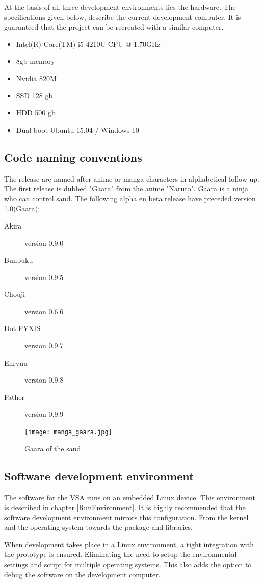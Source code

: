 \documentclass[11pt,fleqn,,a4paper,twoside,openright]{book}
\begin{document}
At the basis of all three development environments lies the hardware. The specifications given below, describe the current development computer. It is guaranteed that the project can be recreated with a similar computer. 
\begin{itemize}
	\item Intel(R) Core(TM) i5-4210U CPU @ 1.70GHz
	\item 8gb memory
	\item Nvidia 820M
	\item SSD 128 gb
	\item HDD 500 gb
	\item Dual boot Ubuntu 15.04 / Windows 10	
\end{itemize}

\subsection{Code naming conventions}
The release are named after anime or manga characters in alphabetical follow up. The first release is dubbed "Gaara" from the anime "Naruto". Gaara is a ninja who can control sand. The following alpha en beta release have preceded version 1.0(Gaara):
\begin{description}
	\item[Akira] version 0.9.0
	\item[Bunpuku] version 0.9.5
	\item[Chouji] version 0.6.6
	\item[Dot PYXIS] version 0.9.7
	\item[Enryuu] version 0.9.8
	\item[Father] version 0.9.9
\end{description}
\begin{figure}[h]
	\texttt{[image: manga\_gaara.jpg]}
	\caption{Gaara of the sand}\label{fig:mangaGaara}
\end{figure}

\subsection{Software development environment}
The software for the VSA runs on an embedded Linux device. This environment is described in chapter \ref{RunEnvironment}. It is highly recommended that the software development environment mirrors this configuration. From the kernel and the operating system towards the package and libraries.

When development takes place in a Linux environment, a tight integration with the prototype is ensured. Eliminating the need to setup the environmental settings and script for multiple operating systems. This also adds the option to debug the software on the development computer. 
\end{document}
